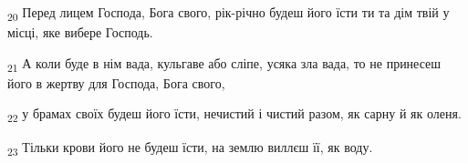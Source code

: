 \begin{tcolorbox}
\textsubscript{20} Перед лицем Господа, Бога свого, рік-річно будеш його їсти ти та дім твій у місці, яке вибере Господь.
\end{tcolorbox}
\begin{tcolorbox}
\textsubscript{21} А коли буде в нім вада, кульгаве або сліпе, усяка зла вада, то не принесеш його в жертву для Господа, Бога свого,
\end{tcolorbox}
\begin{tcolorbox}
\textsubscript{22} у брамах своїх будеш його їсти, нечистий і чистий разом, як сарну й як оленя.
\end{tcolorbox}
\begin{tcolorbox}
\textsubscript{23} Тільки крови його не будеш їсти, на землю виллєш її, як воду.
\end{tcolorbox}
